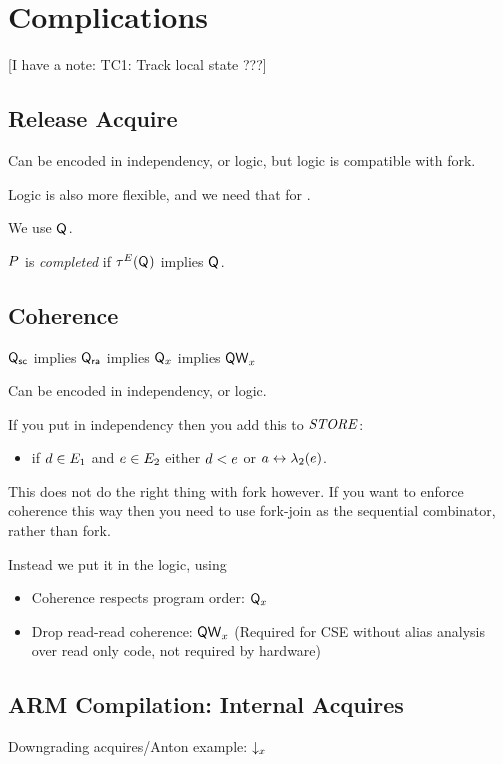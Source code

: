 \section{Complications}

[I have a note: TC1: Track local state ???]

\subsection{Release Acquire}

Can be encoded in independency, or logic, but logic is compatible with fork.

Logic is also more flexible, and we need that for \armeight.

We use $\Q$.

\begin{definition}
  $\aPS$ is \emph{completed} if $\aTr[\aEvs](\Q)$ implies $\Q$.
\end{definition}


\subsection{Coherence}

$\Q[\mSC]$ implies $\Q[\mRA]$ implies $\Qx{\aLoc}$ implies $\Qw{\aLoc}$

Can be encoded in independency, or logic.

If you put in independency then you add this to $\sSTORE{}{}$:
\begin{itemize}
\item if $\bEv\in\aEvs_1$ and $\aEv\in\aEvs_2$ either $\bEv<\SB0\aEv$ or $a\reorder\labeling_2(\aEv)$.
\end{itemize}
This does not do the right thing with fork however.  If you want to enforce
coherence this way then you need to use fork-join as the sequential
combinator, rather than fork.

Instead we put it in the logic, using 

\begin{itemize}
\item Coherence respects program order: $\Qx{\aLoc}$
\item Drop read-read coherence: $\Qw{\aLoc}$ (Required for CSE without
  alias analysis over read only code, not required by hardware)
\end{itemize}



\subsection{ARM Compilation: Internal Acquires}
Downgrading acquires/Anton example: $\Dx{\aLoc}$

